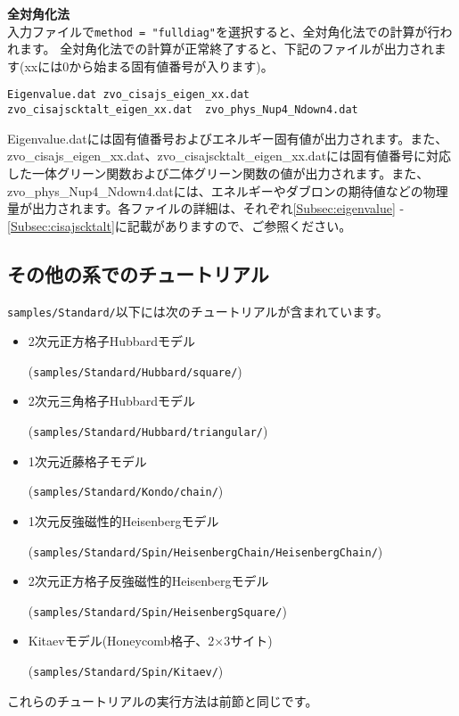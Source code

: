 \begin{description}
\item {\bf 全対角化法}\\
入力ファイルで\verb|method = "fulldiag"|を選択すると、全対角化法での計算が行われます。
全対角化法での計算が正常終了すると、下記のファイルが出力されます(xxには0から始まる固有値番号が入ります)。\\
\begin{minipage}{14cm}
\begin{screen}
\begin{verbatim}
Eigenvalue.dat zvo_cisajs_eigen_xx.dat
zvo_cisajscktalt_eigen_xx.dat  zvo_phys_Nup4_Ndown4.dat
\end{verbatim}
\end{screen}
\end{minipage}

Eigenvalue.datには固有値番号およびエネルギー固有値が出力されます。また、zvo\_cisajs\_eigen\_xx.dat、zvo\_cisajscktalt\_eigen\_xx.datには固有値番号に対応した一体グリーン関数および二体グリーン関数の値が出力されます。また、zvo\_phys\_Nup4\_Ndown4.datには、エネルギーやダブロンの期待値などの物理量が出力されます。各ファイルの詳細は、それぞれ\ref{Subsec:eigenvalue} - \ref{Subsec:cisajscktalt}に記載がありますので、ご参照ください。


\end{description}

\subsection{その他の系でのチュートリアル}

\verb|samples/Standard/|以下には次のチュートリアルが含まれています。

\begin{itemize}
\item 2次元正方格子Hubbardモデル

  (\verb|samples/Standard/Hubbard/square/|)
\item 2次元三角格子Hubbardモデル

  (\verb|samples/Standard/Hubbard/triangular/|)
\item 1次元近藤格子モデル

  (\verb|samples/Standard/Kondo/chain/|)
\item 1次元反強磁性的Heisenbergモデル

  (\verb|samples/Standard/Spin/HeisenbergChain/HeisenbergChain/|)
\item 2次元正方格子反強磁性的Heisenbergモデル

  (\verb|samples/Standard/Spin/HeisenbergSquare/|)
\item Kitaevモデル(Honeycomb格子、2$\times$3サイト)

  (\verb|samples/Standard/Spin/Kitaev/|)

\end{itemize}

これらのチュートリアルの実行方法は前節と同じです。
